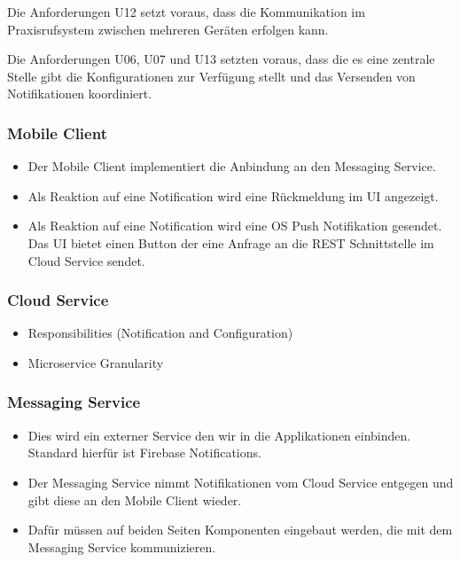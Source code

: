 \clearpage

Die Anforderungen U12 setzt voraus, dass die Kommunikation im Praxisrufsystem
zwischen mehreren Geräten erfolgen kann.

Die Anforderungen U06, U07 und U13 setzten voraus, dass die es eine zentrale Stelle gibt
die Konfigurationen zur Verfügung stellt und das Versenden von Notifikationen koordiniert.


\subsubsection*{Mobile Client}

\begin{itemize}
    \item Der Mobile Client implementiert die Anbindung an den Messaging Service.
    \item Als Reaktion auf eine Notification wird eine Rückmeldung im UI angezeigt.
    \item Als Reaktion auf eine Notification wird eine OS Push Notifikation gesendet.
    Das UI bietet einen Button der eine Anfrage an die REST Schnittstelle im Cloud Service sendet.
\end{itemize}


\subsubsection*{Cloud Service}

\begin{itemize}
    \item Responsibilities (Notification and Configuration)
    \item Microservice Granularity
\end{itemize}


\subsubsection*{Messaging Service}

\begin{itemize}
    \item Dies wird ein externer Service den wir in die Applikationen einbinden. Standard hierfür ist Firebase Notifications.
    \item Der Messaging Service nimmt Notifikationen vom Cloud Service entgegen und gibt diese an den Mobile Client wieder.
    \item Dafür müssen auf beiden Seiten Komponenten eingebaut werden, die mit dem Messaging Service kommunizieren.
\end{itemize}

\clearpage
